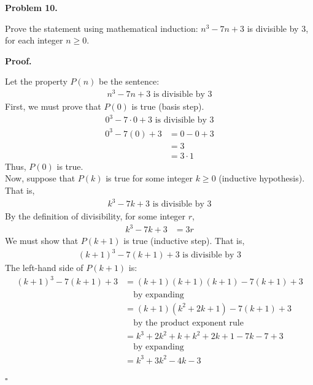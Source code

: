 \documentclass{article}
\newenvironment{problem}[1]{
    \begin{mdframed}[backgroundcolor=gray!20, skipabove=\baselineskip, skipbelow=\baselineskip, nobreak=true, innerleftmargin=10pt, innerrightmargin=10pt, innertopmargin=10pt, innerbottommargin=10pt]
    \textbf{Problem #1.}
}{
    \end{mdframed}
}
\newenvironment{proof}{
    \begin{mdframed}[nobreak=false, innerleftmargin=10pt, innerrightmargin=10pt, innertopmargin=10pt, innerbottommargin=10pt]
    \textbf{Proof.}
}{
    \hfill $\square$
    \end{mdframed}
}
\begin{document}
    \begin{problem}{10}
        Prove the statement using mathematical induction: $n^3 -7n +3$ is divisible by $3$, for each integer $n \geq 0$.
    \end{problem}
    \begin{proof}
        Let the property $P(n)$ be the sentence:
        \begin{align*}
            n^3 -7n +3 \text{ is divisible by } 3
        \end{align*}
        First, we must prove that $P(0)$ is true (basis step).
        \begin{align*}
            0^3 -7 \cdot 0 +3 \text{ is divisible by } 3
        \end{align*}
        \begin{align*}
            0^3 -7(0) +3 &= 0 - 0 + 3 \\
            &= 3 \\
            &= 3 \cdot 1
        \end{align*}
        Thus, $P(0)$ is true. \\
        Now, suppose that $P(k)$ is true for some integer $k \geq 0$ (inductive hypothesis). That is,
        \begin{align*}
            k^3 -7k +3 \text{ is divisible by } 3
        \end{align*}
        By the definition of divisibility, for some integer $r$,
        \begin{align*}
            k^3 -7k +3 &= 3r
        \end{align*}
        We must show that $P(k+1)$ is true (inductive step). That is,
        \begin{align*}
            (k+1)^3 -7(k+1) +3 \text{ is divisible by } 3
        \end{align*}
        The left-hand side of $P(k+1)$ is:
        \begin{align*}
            (k+1)^3 -7(k+1) +3 &= (k+1)(k+1)(k+1) -7(k+1) +3 \\
            & \quad \text{by expanding} \\
            &= (k+1)(k^2 + 2k + 1) -7(k+1) +3 \\
            & \quad \text{by the product exponent rule} \\
            &= k^3 + 2k^2 + k + k^2 + 2k + 1 -7k -7 +3 \\
            & \quad \text{by expanding} \\
            &= k^3 + 3k^2 -4k -3 \\

\end{align*}
\end{proof}
\end{document}
